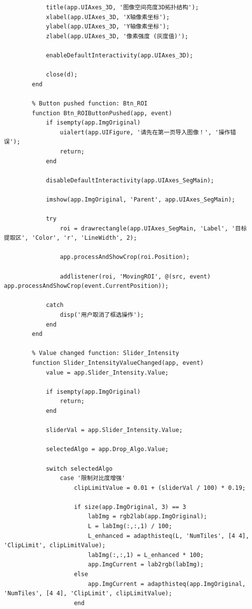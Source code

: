 \documentclass[UTF8, a4paper, 11pt]{ctexart}
\begin{document}
\begin{lstlisting}
            title(app.UIAxes_3D, '图像空间亮度3D拓扑结构');
            xlabel(app.UIAxes_3D, 'X轴像素坐标');
            ylabel(app.UIAxes_3D, 'Y轴像素坐标');
            zlabel(app.UIAxes_3D, '像素强度 (灰度值)');
            
            enableDefaultInteractivity(app.UIAxes_3D);
            
            close(d);
        end

        % Button pushed function: Btn_ROI
        function Btn_ROIButtonPushed(app, event)
            if isempty(app.ImgOriginal)
                uialert(app.UIFigure, '请先在第一页导入图像！', '操作错误');
                return;
            end
            
            disableDefaultInteractivity(app.UIAxes_SegMain);
            
            imshow(app.ImgOriginal, 'Parent', app.UIAxes_SegMain);
            
            try
                roi = drawrectangle(app.UIAxes_SegMain, 'Label', '目标提取区', 'Color', 'r', 'LineWidth', 2);
                
                app.processAndShowCrop(roi.Position);

                addlistener(roi, 'MovingROI', @(src, event) app.processAndShowCrop(event.CurrentPosition));
                
            catch 
                disp('用户取消了框选操作');
            end
        end

        % Value changed function: Slider_Intensity
        function Slider_IntensityValueChanged(app, event)
            value = app.Slider_Intensity.Value;
            
            if isempty(app.ImgOriginal)
                return;
            end
            
            sliderVal = app.Slider_Intensity.Value;
            
            selectedAlgo = app.Drop_Algo.Value;
            
            switch selectedAlgo
                case '限制对比度增强'
                    clipLimitValue = 0.01 + (sliderVal / 100) * 0.19; 
                    
                    if size(app.ImgOriginal, 3) == 3
                        labImg = rgb2lab(app.ImgOriginal);
                        L = labImg(:,:,1) / 100;
                        L_enhanced = adapthisteq(L, 'NumTiles', [4 4], 'ClipLimit', clipLimitValue);
                        labImg(:,:,1) = L_enhanced * 100;
                        app.ImgCurrent = lab2rgb(labImg);
                    else
                        app.ImgCurrent = adapthisteq(app.ImgOriginal, 'NumTiles', [4 4], 'ClipLimit', clipLimitValue);
                    end
                    

\end{lstlisting}
\end{document}
